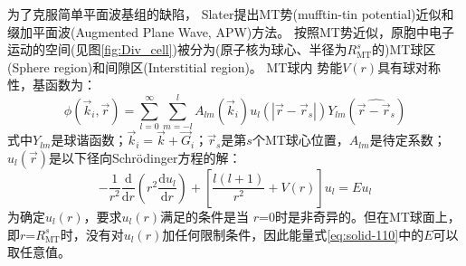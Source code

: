 为了克服简单平面波基组的缺陷，%
Slater提出MT势(mufftin-tin potential)近似和缀加平面波(Augmented Plane Wave, APW)方法\cite{PR51-846_1937}。%
按照MT势近似，原胞中电子运动的空间(见图\ref{fig:Div_cell})被分为(原子核为球心、半径为$R_{\mathrm{MT}}^s$的)MT球区(\textrm{Sphere region})和间隙区(\textrm{Interstitial region})。 
\textrm{MT}球内%
势能$V(r)$具有球对称性，基函数为：
\begin{equation}
  \phi(\vec k_i,\vec r)=\sum_{l=0}^{\infty}\sum_{m=-l}^lA_{lm}(\vec k_i)u_l(|\vec r-\vec r_s|)Y_{lm}(\widehat{\vec r-\vec r_s})
  \label{eq:solid-109}
\end{equation}
式中$Y_{lm}$是球谐函数；$\vec k_i=\vec k+\vec G_i$；$\vec r_s$是第$s$个MT球心位置，$A_{lm}$是待定系数；$u_l(\vec r)$是以下径向Schr\"odinger方程的解：
\begin{equation}
	-\dfrac1{r^2}\dfrac{\mathrm{d}}{\mathrm{d}r}\left(r^2\dfrac{\mathrm{d}u_l}{\mathrm{d}r}\right)+\left[\dfrac{l(l+1)}{r^2}+V(r)\right]u_l=Eu_l
  \label{eq:solid-110}
\end{equation}
为确定$u_l(r)$，要求$u_l(r)$满足的条件是当%
$r$=0时是非奇异的。但在MT球面上，即$r$=$R_{\mathrm{MT}}^s$时，没有对$u_l(r)$加任何限制条件，因此能量式\eqref{eq:solid-110}中的$E$可以取任意值。

